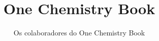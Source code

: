 \documentclass[11pt,a4paper,twoside,openany]{book}
\title{One Chemistry Book}
\author{Os colaboradores do One Chemistry Book}
\date{\bookdate}
\begin{document}
\frontmatter




\tableofcontents

\mainmatter



\appendix
\part{\omsolutionspart}


\backmatter
\printindex
\end{document}
